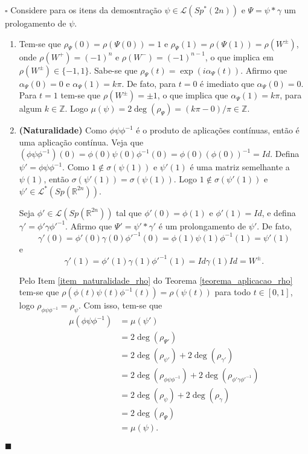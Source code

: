 \documentclass[12pt]{book}
\newenvironment{prova}[1]{$\square$ #1}{\hfill$\blacksquare$}
\newcommand{\caminhosespeciais}[1]{\mathcal{L}^{*}(#1)}
\newcommand{\caminhos}{\mathcal{L}}
\newcommand{\espectrooperador}[1]{\sigma(#1)}
\newcommand{\gruposimpletico}[1]{Sp(#1)}
\newcommand{\gruposimpleticonaodegenerado}[1]{Sp^{#1}(2n)}
\newcommand{\inteiros}{\mathbb{Z}}
\newcommand{\intervalo}{[0,1]}
\newcommand{\real}[1]{\mathbb{R}^{#1}}
\begin{document}
	\begin{prova}
		
		Considere para os itens da demosntração $\psi \in \caminhos{(\gruposimpleticonaodegenerado{*})}$ e $\Psi=\psi * \gamma$ um prologamento de $\psi$.
		\begin{enumerate}
			\item Tem-se que $\rho_{\Psi}(0) = \rho(\Psi(0)) = 1$ e $\rho_{\Psi}(1) = \rho(\Psi(1)) = \rho(W^{\pm})$, onde $\rho(W^{+})=(-1)^{n}$ e $\rho(W^{-})=(-1)^{n-1}$, o que implica em $\rho(W^{\pm}) \in \{ -1,1\}$. Sabe-se que $\rho_{\Psi}(t) = \exp(i\alpha_{\Psi}(t))$. Afirmo que $\alpha_{\Psi}(0)=0$ e $\alpha_{\Psi}(1)=k\pi$. De fato, para $t=0$ é imediato que $\alpha_{\Psi}(0)=0$. Para $t=1$ tem-se que $\rho(W^{\pm}) = \pm 1$, o que implica que $\alpha_{\Psi}(1) = k\pi$, para algum $k\in \inteiros$. Logo $\mu(\psi) = 2\deg(\rho_{\Psi}) = (k\pi-0)/\pi \in \inteiros$.
			
			\item \textbf{(Naturalidade)}
			Como $\phi\psi\phi^{-1}$ é o produto de aplicações contínuas, então é uma aplicação contínua. Veja que $(\phi\psi\phi^{-1})(0) = \phi(0)\psi(0)\phi^{-1}(0) = \phi(0)(\phi(0))^{-1} = Id$. Defina $\psi'=\phi\psi\phi^{-1}$. Como $1\notin \espectrooperador{\psi(1)}$ e $\psi'(1)$ é uma matriz semelhante a $\psi(1)$, então $\espectrooperador{\psi'(1)}=\espectrooperador{\psi(1)}$. Logo $1\notin \espectrooperador{\psi'(1)}$ e $\psi'\in \caminhosespeciais{\gruposimpletico{\real{2n}}}$.
			
			Seja $\phi'\in \caminhos(\gruposimpletico{\real{2n}})$ tal que $\phi'(0) = \phi(1)$ e $\phi'(1) = Id$, e defina $\gamma'=\phi'\gamma\phi'^{-1}$. Afirmo que $\Psi'=\psi'*\gamma'$ é um prolongamento de $\psi'$. De fato, 
			$$
			\gamma'(0)=\phi'(0)\gamma(0)\phi'^{-1}(0) = \phi(1)\psi(1)\phi^{-1}(1) = \psi'(1)
			$$ 
			e 
			$$
			\gamma'(1)=\phi'(1)\gamma(1)\phi'^{-1}(1) = Id\gamma(1)Id = W^{\pm}.
			$$
			
			Pelo Item \ref{item_naturalidade_rho} do Teorema \ref{teorema_aplicacao_rho} tem-se que  $\rho(\phi(t)\psi(t)\phi^{-1}(t)) = \rho(\psi(t))$ para todo $t\in \intervalo$, logo $\rho_{\phi\psi\phi^{-1}} = \rho_{\psi}$. Com isso, tem-se que 
			$$
			\begin{aligned}
			\mu(\phi\psi\phi^{-1})
			&=\mu(\psi')
			\\
			&= 2\deg(\rho_{\Psi'})
			\\
			&= 2\deg(\rho_{\psi'}) + 2\deg(\rho_{\gamma'})
			\\
			&=2\deg(\rho_{\phi\psi\phi^{-1}}) + 2\deg(\rho_{\phi'\gamma\phi'^{-1}})
			\\
			&=2\deg(\rho_{\psi}) + 2\deg(\rho_{\gamma})
			\\
			&=2\deg(\rho_{\Psi})
			\\
			&= \mu(\psi).			
			\end{aligned}
			$$
			

\end{enumerate}
\end{prova}
\end{document}

